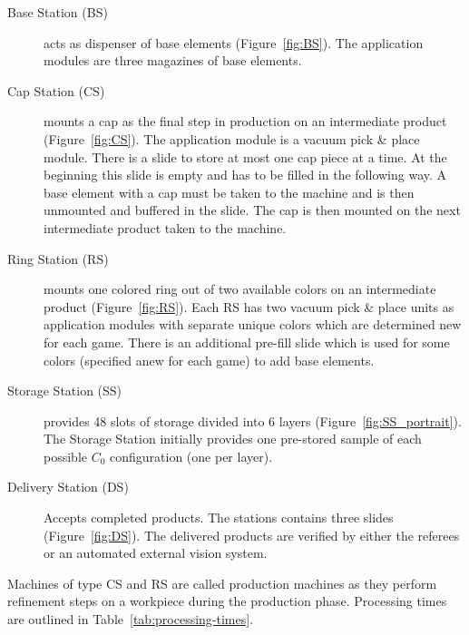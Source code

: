 \documentclass[12pt,twoside]{article}
\newcommand{\reffig}[1]{Figure~\ref{#1}}
\newcommand{\reftab}[1]{Table~\ref{#1}}
\begin{document}
\begin{description}
\item[Base Station (BS)] acts as dispenser of base elements
  (\reffig{fig:BS}). The application modules are three magazines of
  base elements.

\item[Cap Station (CS)] mounts a cap as the final step in production
  on an intermediate product (\reffig{fig:CS}). The application module
  is a vacuum pick \& place module. There is a slide to store at most
  one cap piece at a time. At the beginning this slide is empty and
  has to be filled in the following way.  A base element with a cap
  must be taken to the machine and is then unmounted and buffered in
  the slide. The cap is then mounted on the next intermediate product
  taken to the machine.

\item[Ring Station (RS)] mounts one colored ring out of two available
  colors on an intermediate product (\reffig{fig:RS}). Each RS has two
  vacuum pick \& place units as application modules with separate
  unique colors which are determined new for each game. There is an
  additional pre-fill slide which is used for some colors (specified
  anew for each game) to add base elements.

\item[Storage Station (SS)] provides 48 slots of storage divided into
  6 layers (\reffig{fig:SS_portrait}).
  The Storage Station initially provides one pre-stored sample of each possible
  $C_0$ configuration (one per layer).

\item[Delivery Station (DS)] Accepts completed products. The stations contains
  three slides (\reffig{fig:DS}). The delivered products are verified by either
  the referees or an automated external vision system.
\end{description}

\noindent
Machines of type CS and RS are called production machines as they
perform refinement steps on a workpiece during the production
phase. Processing times are outlined in \reftab{tab:processing-times}.
\end{document}
